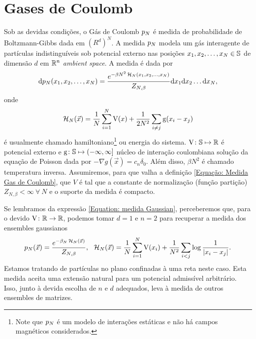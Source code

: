 \section{Gases de Coulomb}
\label{Section: Gases de Coulomb}

Sob as devidas condições, o Gás de Coulomb $p_N$ \cite{ChafaCoulombMeasure} é medida de probabilidade de Boltzmann-Gibbs dada em $(R^d)^N$. A medida $p_N$ modela um gás interagente de partículas indistinguíveis sob potencial externo nas posições $x_1, x_2, \dots, x_N \in \mathbb{S}$ de dimensão $d$ em $\mathbb{R}^n$ \textit{ambient space}. A medida é dada por 
\begin{equation}
	\dd p_N(x_1, x_2, \dots, x_N) = \frac{e^{-\beta N^2 \operatorname{\mathcal{H}}_N(x_1, x_2, \dots, x_N)}}{Z_{N,\beta}} \dd x_1  \dd x_2  \dots  \dd x_N,
	\label{Equação: Medida Gas de Coulomb}
\end{equation}
onde $$\operatorname{\mathcal{H}}_N(\vec{x}) = \frac{1}{N} \sum_{i = 1}^{N} \operatorname{V}(x) + \frac{1}{2N^2} \sum_{i \neq j} \operatorname{g}(x_i - x_j)$$ é usualmente chamado hamiltoniano\footnote{Note que $p_N$ é um modelo de interações estáticas e não há campos magnéticos considerados.} ou energia do sistema. $\operatorname{V} \colon \mathbb{S} \mapsto \mathbb{R}$ é potencial externo e $\operatorname{g} \colon \mathbb{S} \mapsto (-\infty, \infty]$ núcleo de interação coulombiana solução da equação de Poisson dada por $- \nabla g(\vec{x}) = c_n\delta_0$. Além disso, $\beta N^2$ é chamado temperatura inversa. Assumiremos, para que valha a definição \ref{Equação: Medida Gas de Coulomb}, que $V$ é tal que a constante de normalização (função partição) $Z_{N, \beta} < \infty \ \forall \ N$ e o suporte da medida é compacto.

Se lembramos da expressão \ref{Equation: medida Gaussian}, perceberemos que, para o devido $\operatorname{V} \colon \mathbb{R} \rightarrow \mathbb{R}$, podemos tomar $d=1$ e $n = 2$ para recuperar a medida dos ensembles gaussianos 
\begin{equation}
	p_N(\vec{x}) = \frac{e^{-\beta_N \operatorname{\mathcal{H}}_N(\vec{x})}}{Z_{N,\beta}}, \ \ \operatorname{\mathcal{H}}_N(\vec{x}) = \frac{1}{N} \sum_{i = 1}^{N} \operatorname{V}(x_i) + \frac{1}{N^2} \sum_{i < j} \log{\frac{1}{|x_i - x_j|}}.
	\label{Equation: Medida Log V}
\end{equation}
Estamos tratando de partículas no plano confinadas à uma reta neste caso. Esta medida aceita uma extensão natural para um potencial admissível arbitrário. Isso, junto à devida escolha de $n$ e $d$ adequados, leva à medida de outros ensembles de matrizes.